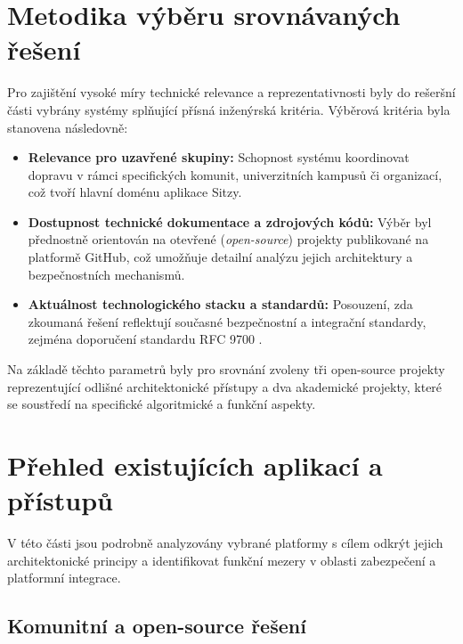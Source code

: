 \documentclass[male,czech,api_bc]{kitheses}
\begin{document}
\section{Metodika výběru srovnávaných řešení}
\label{sec:metodika_vyberu}

Pro zajištění vysoké míry technické relevance a reprezentativnosti byly do rešeršní části vybrány systémy splňující přísná inženýrská kritéria. Výběrová kritéria byla stanovena následovně:

\begin{itemize}
    
    \item \textbf{Relevance pro uzavřené skupiny:} Schopnost systému koordinovat dopravu v rámci specifických komunit, univerzitních kampusů či organizací, což tvoří hlavní doménu aplikace Sitzy.
    
    \item \textbf{Dostupnost technické dokumentace a zdrojových kódů:} Výběr byl přednostně orientován na otevřené (\textit{open-source}) projekty publikované na platformě GitHub, což umožňuje detailní analýzu jejich architektury a bezpečnostních mechanismů.
    
    \item \textbf{Aktuálnost technologického stacku a standardů:} Posouzení, zda zkoumaná řešení reflektují současné bezpečnostní a integrační standardy, zejména doporučení standardu RFC 9700 \cite{Lodderstedt2025}.
    
\end{itemize}

Na základě těchto parametrů byly pro srovnání zvoleny tři open-source projekty reprezentující odlišné architektonické přístupy a dva akademické projekty, které se soustředí na specifické algoritmické a funkční aspekty.

\section{Přehled existujících aplikací a přístupů}
\label{sec:prehled_aplikaci}

V této části jsou podrobně analyzovány vybrané platformy s cílem odkrýt jejich architektonické principy a identifikovat funkční mezery v oblasti zabezpečení a platformní integrace.

\subsection{Komunitní a open-source řešení}
\label{subsec:open_source_reseni}
\end{document}
